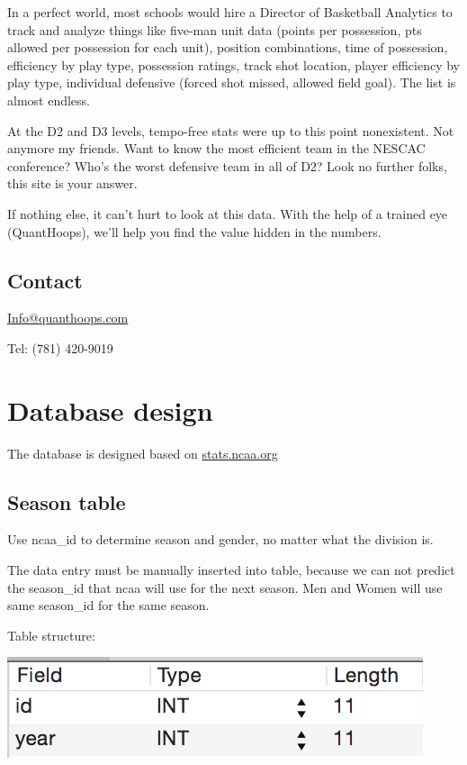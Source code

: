 \documentclass[letterpaper,10pt,english]{sphinxmanual}
\begin{document}
In a perfect world, most schools would hire a Director of Basketball Analytics
to track and analyze things like five-man unit data (points per possession,
pts allowed per possession for each unit), position combinations, time of
possession, efficiency by play type, possession ratings, track shot location,
player efficiency by play type, individual defensive (forced shot missed,
allowed field goal). The list is almost endless.

At the D2 and D3 levels, tempo-free stats were up to this point nonexistent.
Not anymore my friends. Want to know the most efficient team in the NESCAC
conference? Who’s the worst defensive team in all of D2? Look no further folks,
this site is your answer.

If nothing else, it can’t hurt to look at this data. With the help of a trained
eye (QuantHoops), we’ll help you find the value hidden in the numbers.


\section{Contact}
\label{_static/basic:contact}
\href{mailto:Info@quanthoops.com}{Info@quanthoops.com}

Tel: (781) 420-9019


\chapter{Database design}
\label{_static/database::doc}\label{_static/database:database-design}
The database is designed based on \href{http://stats.ncaa.org/}{stats.ncaa.org}


\section{Season table}
\label{_static/database:season-table}
Use ncaa\_id to determine season and gender, no matter what the division is.

The data entry must be manually inserted into table, because we can not predict
the season\_id that ncaa will use for the next season. Men and Women will use
same season\_id for the same season.

Table structure:

\includegraphics{season_table.png}
\end{document}
